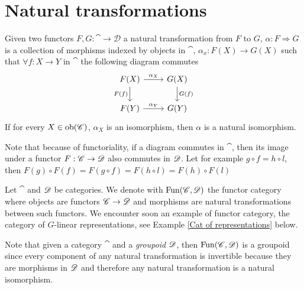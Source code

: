 \section{Natural transformations} %
\label{sub:natural_transformations}

\begin{defn}
    Given two functors $F,G: \cat \to \mathscr{D}$ a natural transformation from $F$ to $G$, $\alpha : F \Rightarrow G$ is a collection of morphisms indexed by objects in $\cat$, $\alpha_x: F(X) \to G(X)$ such that $\forall f: X\to Y$ in $\cat$ the following diagram commutes
    \[ \begin{tikzcd}
        {F(X)} & {G(X)} \\
        {F(Y)} & {G(Y)}
        \arrow["{F(f)}"', from=1-1, to=2-1]
        \arrow["{\alpha_X}", from=1-1, to=1-2]
        \arrow["{\alpha_Y}", from=2-1, to=2-2]
        \arrow["{G(f)}", from=1-2, to=2-2]
    \end{tikzcd}\]
    If for every $ X\in \operatorname{ob}(\mathscr{C})$, $\alpha_X$ is an isomorphism, then $\alpha$ is a natural isomorphism.
\end{defn}
\begin{rem}\label{FunctorsPreserveCommut}
    Note that because of functoriality, if a diagram commutes in $\cat$, then its image under a functor $F:\mathscr{C}\to\mathscr{D}$ also commutes in $\mathscr{D}$. Let for example $g\circ f=h\circ l$, then $F(g)\circ F(f)=F(g\circ f)=F(h\circ l)=F(h)\circ F(l)$
\end{rem}
\begin{notat}\label{FunCat}
    Let $\cat$ and $\mathscr{D}$ be categories. We denote with $\operatorname{Fun}(\mathscr{C},\mathscr{D})$ the functor category where objects are functors $\mathscr{C}\to\mathscr{D}$ and morphisms are natural transformations between such functors. We encounter soon an example of functor category, the category of $G$-linear representations, see Example \ref{Cat of representations} below.
\end{notat}
\begin{rem}\label{FunctorGroupoids}
    Note that given a category $\cat$ and a \emph{groupoid} $\mathscr{D}$, then $\operatorname{Fun}(\mathscr{C},\mathscr{D})$ is a groupoid since every component of any natural transformation is invertible because they are morphisms in $\mathscr{D}$ and therefore any natural transformation is a natural isomorphism.
\end{rem}

